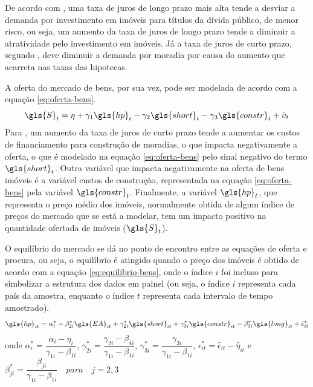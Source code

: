 \documentclass[
	12pt,				%
	oneside,			%
	a4paper,			%
	chapter=TITLE,		%
	section=TITLE,		%
	english,			%
	brazil				%
	]{abntex2}
\begin{document}
\begin{refsection}
De acordo com \textcite[p.~7-8]{ADAMS2010}, uma taxa de juros de longo prazo mais alta
tende a desviar a demanda por investimento em imóveis para títulos da dívida
público, de menor risco, ou seja, um aumento da taxa de juros de longo prazo
tende a diminuir a atratividade pelo investimento em imóveis. Já a taxa de juros
de curto prazo, segundo \textcite[p.~7]{ADAMS2010}, deve diminuir a demanda por moradia
por causa do aumento que acarreta nas taxas das hipotecas.

A oferta do mercado de bens, por sua vez, pode ser modelada de acordo com a
equação \eqref{eq:oferta-bens}.
\begin{equation}
\gls{S}_t = \eta + \gamma_1 \gls{hp}_t - \gamma_2 \gls{short}_t - 
\gamma_3 \gls{constr}_t + \tilde \upsilon_t
\label{eq:oferta-bens}
\end{equation}
Para \textcite[p.~7-8]{ADAMS2010}, um aumento da taxa de juros de curto prazo tende a
aumentar os custos de financiamento para construção de moradias, o que impacta
negativamente a oferta, o que é modelado na equação \eqref{eq:oferta-bens} pelo
sinal negativo do termo \(\gls{short}_t\). Outra variável que impacta
negativamente na oferta de bens imóveis é a variável custos de construção,
representada na equação \eqref{eq:oferta-bens} pela variável \(\gls{constr}_t\).
Finalmente, a variável \(\gls{hp}_t\), que representa o preço médio dos imóveis,
normalmente obtida de algum índice de preços do mercado que se está a modelar,
tem um impacto positivo na quantidade ofertada de imóveis (\(\gls{S}_t\)).

O equilíbrio do mercado se dá no ponto de encontro entre as equações de oferta e
procura, ou seja, o equilíbrio é atingido quando o preço dos imóveis é obtido de
acordo com a equação \eqref{eq:equilibrio-bens}, onde o índice \(i\) foi incluso
para simbolizar a estrutura dos dados em painel (ou seja, o índice \(i\)
representa cada país da amostra, enquanto o índice \(t\) representa cada intervalo
de tempo amostrado).
\begin{equation}
\gls{hp}_{it} = \alpha^*_i - \beta_{2i}^* \gls{EA}_{it} + 
\gamma^*_{2i} \gls{short}_{it} + \gamma^*_{3i} \gls{constr}_{it} - 
\beta^*_{3i} \gls{long}_{it} + \hat \epsilon^*_{it}
\label{eq:equilibrio-bens}
\end{equation}
onde \(\alpha^*_i = \dfrac{\alpha_i - \eta_i}{\gamma_{1i} - \beta_{1i}}\),
\(\gamma^*_{2i} = \dfrac{\gamma_{2i} - \beta_{4i}}{\gamma_{1i} - \beta_{1i}}\),
\(\gamma^*_{3i} = \dfrac{\gamma_{3i}}{\gamma_{1i}-\beta_{1i}}\),
\(\epsilon^*_{it} = \hat \epsilon_{it} - \hat \eta_{it}\) e\\
\(\beta^*_{ji} = \dfrac{\beta_{ji}}{\gamma_{1i} - \beta_{1i}} \quad para \quad j = 2, 3\)


\end{refsection}
\end{document}
